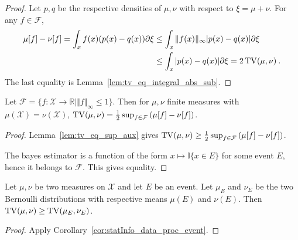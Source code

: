 \begin{proof}
Let $p,q$ be the respective densities of $\mu, \nu$ with respect to $\xi=\mu+\nu$.
For any $f \in \mathcal F$,
\begin{align*}
\mu[f] - \nu[f]
= \int_x f(x)(p(x) - q(x)) \partial\xi
&\le \int_x \Vert f(x) \Vert_\infty \vert p(x) - q(x) \vert \partial\xi
\\
&\le \int_x \vert p(x) - q(x) \vert \partial\xi
= 2 \operatorname{TV}(\mu, \nu)
\: .
\end{align*}
The last equality is Lemma~\ref{lem:tv_eq_integral_abs_sub}.
\end{proof}


\begin{theorem}
  \label{thm:tv_eq_sup_sub_integral}
  Let $\mathcal F = \{f : \mathcal X \to \mathbb{R} \mid \Vert f \Vert_\infty \le 1\}$.
  Then for $\mu, \nu$ finite measures with $\mu(\mathcal X) = \nu(\mathcal X)$, $\operatorname{TV}(\mu, \nu) = \frac{1}{2} \sup_{f \in \mathcal F} \left( \mu[f] - \nu[f] \right)$.
\end{theorem}

\begin{proof}
Lemma~\ref{lem:tv_eq_sup_aux} gives $\operatorname{TV}(\mu, \nu) \ge \frac{1}{2} \sup_{f \in \mathcal F} \left( \mu[f] - \nu[f] \right)$.

The bayes estimator is a function of the form $x \mapsto \mathbb{I}\{x \in E\}$ for some event $E$, hence it belongs to $\mathcal F$. This gives equality.
\end{proof}


\begin{lemma}
  \label{lem:tv_data_proc_event}
  Let $\mu, \nu$ be two measures on $\mathcal X$ and let $E$ be an event. Let $\mu_E$ and $\nu_E$ be the two Bernoulli distributions with respective means $\mu(E)$ and $\nu(E)$.
  Then $\operatorname{TV}(\mu, \nu) \ge \operatorname{TV}(\mu_E, \nu_E)$.
\end{lemma}

\begin{proof}
Apply Corollary~\ref{cor:statInfo_data_proc_event}.
\end{proof}
